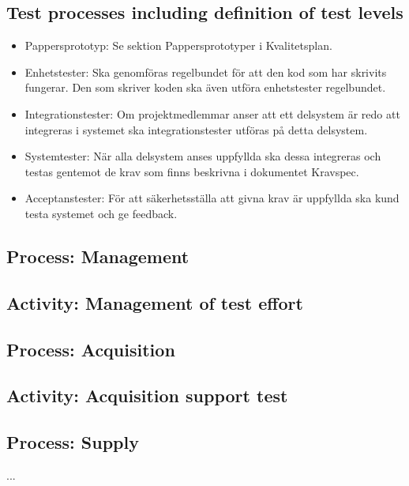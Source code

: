 \documentclass[a4paper,10pt]{article}
\begin{document}
\subsection{Test processes including definition of test levels}
\begin{itemize}
	\item Pappersprototyp: Se sektion Pappersprototyper i Kvalitetsplan.
	\item Enhetstester: Ska genomföras regelbundet för att den kod som har skrivits fungerar. Den som skriver koden ska även utföra enhetstester regelbundet.
	\item Integrationstester: Om projektmedlemmar anser att ett delsystem är redo att integreras i systemet ska integrationstester utföras på detta delsystem.
	\item Systemtester: När alla delsystem anses uppfyllda ska dessa integreras och testas gentemot de krav som finns beskrivna i dokumentet Kravspec.
	\item Acceptanstester: För att säkerhetsställa att givna krav är uppfyllda ska kund testa systemet och ge feedback.
\end{itemize}

\subsection{Process: Management}
\subsection{Activity: Management of test effort}
\subsection{Process: Acquisition}
\subsection{Activity: Acquisition support test}
\subsection{Process: Supply}

...
\end{document}
